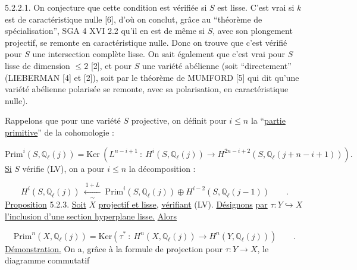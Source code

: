 
5.2.2.1.  On conjecture que cette condition est vérifiée si $S$ est lisse. C'est vrai si $k$ est de caractéristique nulle [6], d'où on conclut, grâce au ``théorème de spécialisation'', SGA 4 XVI 2.2 qu'il en est de même si $S$, avec son plongement projectif, se remonte en caractéristique nulle. Donc on trouve que c'est vérifié pour $S$ une intersection complète lisse. On sait également que c'est vrai pour $S$ lisse de dimension $\leq 2$ [2], et pour $S$ une variété abélienne (soit ``directement'' (LIEBERMAN [4] et [2]), soit par le théorème de MUMFORD [5] qui dit qu'une variété abélienne polarisée se remonte, avec sa polarisation, en caractéristique nulle).

Rappelons que pour une variété $S$ projective, on définit pour $i \leq n$ la ``\underline{partie primitive}'' de la cohomologie :

\begin{equation}\tag{5.2.2.2}
\mathrm{Prim}^i(S,\mathbb{Q}_\ell(j)) = \mathrm{Ker}\ (L^{n-i+1} \ :\ H^i(S,\mathbb{Q}_\ell(j)) \longrightarrow H^{2n-i+2}(S,\mathbb{Q}_\ell(j+n-i+1))).
\end{equation}
\underline{Si} $S$ vérifie (LV), on a pour $i \leq n$ la décomposition :

\begin{equation}\tag{5.2.2.3}
H^i(S,\mathbb{Q}_\ell(j)) \ \xleftarrow[\sim]{\ 1+L\ }\ \mathrm{Prim}^i(S,\mathbb{Q}_\ell(j)) \oplus H^{i-2}(S,\mathbb{Q}_\ell(j-1)) \qquad .
\end{equation}
\underline{Proposition} 5.2.3.  \underline{Soit} $X$ \underline{projectif et lisse,} \underline{vérifiant} (LV). \underline{Désignons} \underline{par} $\tau : Y \hookrightarrow X$ \underline{l'inclusion d'une section hyperplane lisse.} \underline{Alors}

\begin{equation}\tag{5.2.3.1}
\mathrm{Prim}^n(X,\mathbb{Q}_\ell(j)) = \mathrm{Ker}(\tau^* \ :\ H^n(X,\mathbb{Q}_\ell(j)) \longrightarrow H^n(Y,\mathbb{Q}_\ell(j))) \qquad .
\end{equation}
\underline{Démonstration.}  On a, grâce à la formule de projection pour $\tau : Y \longrightarrow X$, le diagramme commutatif 



